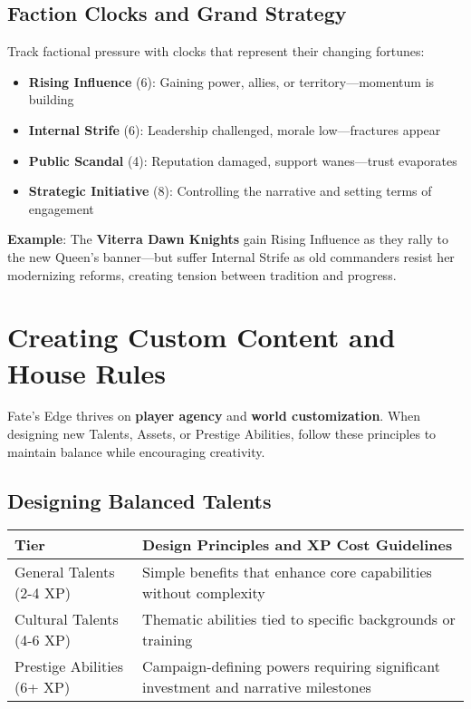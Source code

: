 \subsection*{Faction Clocks and Grand Strategy}

Track factional pressure with clocks that represent their changing fortunes:

\begin{itemize}
    \item \textbf{Rising Influence} (6): Gaining power, allies, or territory---momentum is building
    \item \textbf{Internal Strife} (6): Leadership challenged, morale low---fractures appear
    \item \textbf{Public Scandal} (4): Reputation damaged, support wanes---trust evaporates
    \item \textbf{Strategic Initiative} (8): Controlling the narrative and setting terms of engagement
\end{itemize}

\textbf{Example}: The \textbf{Viterra Dawn Knights} gain Rising Influence as they rally to the new Queen's banner---but suffer Internal Strife as old commanders resist her modernizing reforms, creating tension between tradition and progress.

\section*{Creating Custom Content and House Rules}

Fate's Edge thrives on \textbf{player agency} and \textbf{world customization}. When designing new Talents, Assets, or Prestige Abilities, follow these principles to maintain balance while encouraging creativity.

\subsection*{Designing Balanced Talents}

\begin{fatebox}
\begin{tabularx}{\textwidth}{lX}
\toprule
\textbf{Tier} & \textbf{Design Principles and XP Cost Guidelines} \\
\midrule
General Talents (2-4 XP) & Simple benefits that enhance core capabilities without complexity \\
Cultural Talents (4-6 XP) & Thematic abilities tied to specific backgrounds or training \\
Prestige Abilities (6+ XP) & Campaign-defining powers requiring significant investment and narrative milestones \\
\bottomrule
\end{tabularx}
\end{fatebox}

